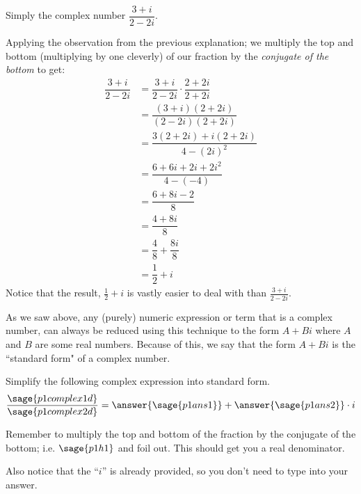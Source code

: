 \documentclass{ximera}
\begin{document}
\begin{example}%
    Simply the complex number $\dfrac{3 + i}{2 - 2i}$.
    
    Applying the observation from the previous explanation; we multiply the top and bottom (multiplying by one cleverly) of our fraction by the \textit{conjugate of the bottom} to get:
    \begin{align*}
        \dfrac{3+ i}{2 - 2i}    & = \dfrac{3+ i}{2 - 2i} \cdot \dfrac{2 + 2i}{2 + 2i}      \\
                                & = \dfrac{(3+i)(2 + 2i)}{(2-2i)(2+2i)}                    \\
                                & = \dfrac{3(2 + 2i) + i(2 + 2i)}{4 - (2i)^2}              \\
                                & = \dfrac{6 + 6i + 2i +2i^2}{4 - (-4)}                    \\
                                & = \dfrac{6 + 8i -2}{8}                                   \\
                                & = \dfrac{4 + 8i}{8}                                      \\
                                & = \dfrac{4}{8} + \dfrac{8i}{8}                           \\
                                & = \dfrac{1}{2} + i                                                             
    \end{align*}
    Notice that the result, $\frac{1}{2} + i$ is vastly easier to deal with than $\frac{3 + i}{2 - 2i}$.
    
    
\end{example}%

As we saw above, any (purely) numeric expression or term that is a complex number, can always be reduced using this technique to the form $A + Bi$ where $A$ and $B$ are some real numbers. Because of this, we say that the form $A + Bi$ is the ``standard form" of a complex number.

\begin{problem}
    Simplify the following complex expression into standard form.
    \[
        \frac{\sage{p1complex1d}}{\sage{p1complex2d}} = \answer{\sage{p1ans1}} + \answer{\sage{p1ans2}}\cdot i
    \]
    \begin{feedback}
        Remember to multiply the top and bottom of the fraction by the conjugate of the bottom; i.e. $\sage{p1h1}$ and foil out. This should get you a real denominator.
        
        Also notice that the ``$i$'' is already provided, so you don't need to type into your answer.
    \end{feedback}
    
\end{problem}
\end{document}
